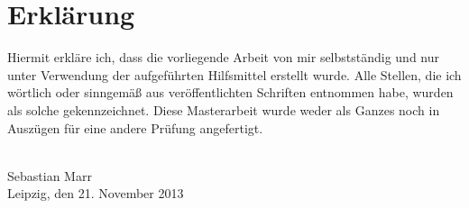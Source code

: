 \chapter*{Erklärung}

Hiermit erkläre ich, dass die vorliegende Arbeit von mir selbstständig und nur unter Verwendung der aufgeführten Hilfsmittel erstellt wurde. Alle Stellen, die ich wörtlich oder sinngemäß aus veröffentlichten Schriften entnommen habe, wurden als solche gekennzeichnet. Diese Masterarbeit wurde weder als Ganzes noch in Auszügen für eine andere Prüfung angefertigt.

{
\vspace{32pt}
\noindent
\hdashrule{5cm}{1pt}{1pt 3pt}\\
Sebastian Marr\\
Leipzig, den 21. November 2013
}
